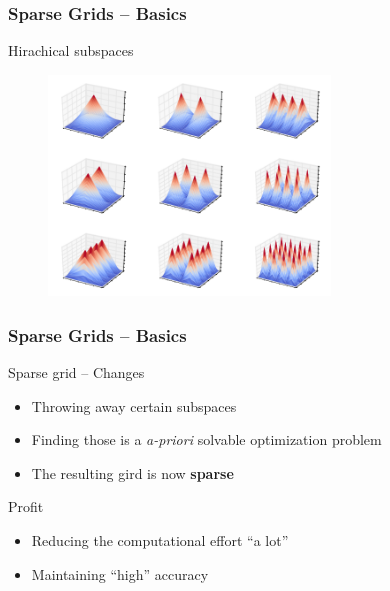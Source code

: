 \begin{frame}
  \frametitle{Sparse Grids -- Basics}
  \topline
  \vspace{-10px}
  \begin{block}{Hirachical subspaces}
    \begin{figure}[!htp]
      \centering
      \includegraphics[width=7.5cm]{images/sparsegrid_2dhats}
      \vspace{-12px}
      \caption{}
    \end{figure}
  \end{block}
\end{frame}

\begin{frame}
  \frametitle{Sparse Grids -- Basics}
  \topline
  \vspace{-10px}
  \begin{block}{Sparse grid -- Changes}
    \begin{itemize}
      \item Throwing away certain subspaces
      \item Finding those is a \emph{a-priori} solvable optimization problem
      \item The resulting gird is now \textbf{sparse}
      \end{itemize}
  \end{block}
  \begin{block}{Profit}
    \begin{itemize}
      \item Reducing the computational effort ``a lot''
      \item Maintaining ``high'' accuracy
      \end{itemize}
  \end{block}
\end{frame}

